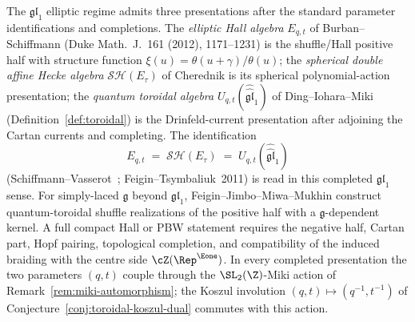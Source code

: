 \begin{remark}
\label{rem:elliptic-hall-spherical-daha-genus-1}
The $\mathfrak{gl}_1$ elliptic regime admits three presentations after the standard parameter identifications and completions. The \emph{elliptic Hall algebra} $E_{q,t}$ of Burban--Schiffmann (Duke Math.~J.~161 (2012), 1171--1231) is the shuffle/Hall positive half with structure function $\xi(u) = \theta(u+\gamma)/\theta(u)$; the \emph{spherical double affine Hecke algebra} $\mathcal{SH}(E_\tau)$ of Cherednik is its spherical polynomial-action presentation; the \emph{quantum toroidal algebra} $U_{q,t}(\hat{\hat{\mathfrak{gl}}}_1)$ of Ding--Iohara--Miki~\cite{DI97,Miki07} (Definition~\ref{def:toroidal}) is the Drinfeld-current presentation after adjoining the Cartan currents and completing. The identification
\[
 E_{q,t} \;=\; \mathcal{SH}(E_\tau) \;=\; U_{q,t}(\hat{\hat{\mathfrak{gl}}}_1)
\]
(Schiffmann--Vasserot~\cite{SV13}; Feigin--Tsymbaliuk~2011) is read in this completed $\mathfrak{gl}_1$ sense. For simply-laced $\mathfrak{g}$ beyond $\mathfrak{gl}_1$, Feigin--Jimbo--Miwa--Mukhin construct quantum-toroidal shuffle realizations of the positive half with a $\mathfrak{g}$-dependent kernel. A full compact Hall or PBW statement requires the negative half, Cartan part, Hopf pairing, topological completion, and compatibility of the induced braiding with the centre side $\cZ(\Rep^{\Eone})$. In every completed presentation the two parameters $(q,t)$ couple through the $\SL_2(\Z)$-Miki action of Remark~\ref{rem:miki-automorphism}; the Koszul involution $(q,t) \mapsto (q^{-1}, t^{-1})$ of Conjecture~\ref{conj:toroidal-koszul-dual} commutes with this action.
\end{remark}

